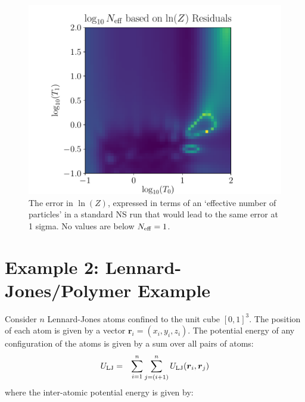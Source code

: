 \documentclass[entropy,article,submit,moreauthors,pdftex,10pt,a4paper]{Definitions/mdpi}
\begin{document}
\begin{figure}[!ht]
\centering
\includegraphics[scale=0.6]{figures/demo_N_eff.pdf}
\caption{The error in $\ln(Z)$, expressed in terms of an
`effective number of particles' in a standard NS run that would lead to
the same error at 1 sigma. No values are below $N_{\rm eff} = 1$.
\label{fig:demo_N_eff}}
\end{figure}





\section{Example 2: Lennard-Jones/Polymer Example}

Consider $n$ Lennard-Jones atoms confined to the unit cube $[0, 1]^3$.
The position of each atom is given by a vector
$\boldsymbol{r}_i = (x_i, y_i, z_i)$.
The potential energy of any configuration of the atoms is given by
a sum over all pairs of atoms:
\begin{eqnarray}
U_{\rm LJ} &=& \sum_{i=1}^n\sum_{j=(i+1)}^n U_{\rm LJ}
(\boldsymbol{r}_i, \boldsymbol{r}_j)
\end{eqnarray}
where the inter-atomic potential energy is given by:
\end{document}
